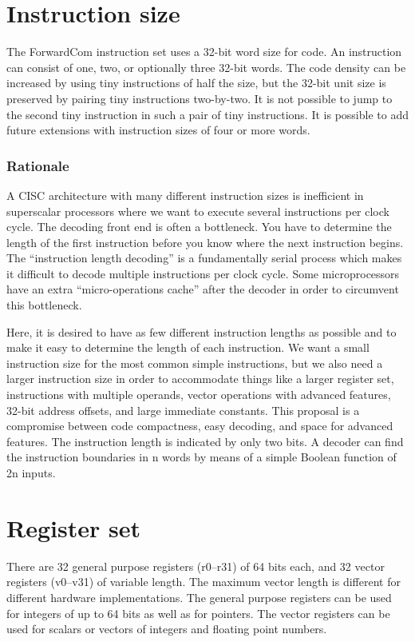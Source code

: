 \documentclass[forwardcom.tex]{subfiles}
\begin{document}
\section{Instruction size}
The ForwardCom instruction set uses a 32-bit word size for code. 
An instruction can consist of one, two, or optionally three 32-bit words. The code density can be increased by using tiny instructions of half the size, but the 32-bit unit size is preserved by pairing tiny instructions two-by-two. It is not possible to jump to the second tiny instruction in such a pair of tiny instructions. It is possible to add future extensions with instruction sizes of four or more words.

\subsubsection{Rationale}
A CISC architecture with many different instruction sizes is inefficient in superscalar processors where we want to execute several instructions per clock cycle. The decoding front end is often a bottleneck. You have to determine the length of the first instruction before you know where the next instruction begins. The ``instruction length decoding'' is a fundamentally serial process which makes it difficult to decode multiple instructions per clock cycle. Some microprocessors have an extra ``micro-operations cache'' after the decoder in order to circumvent this bottleneck.
\vspace{2mm}

Here, it is desired to have as few different instruction lengths as possible and to make it easy to determine the length of each instruction. We want a small instruction size for the most common simple instructions, but we also need a larger instruction size in order to accommodate things like a larger register set, instructions with multiple operands, vector operations with advanced features, 32-bit address offsets, and large immediate constants. This proposal is a compromise between code compactness, easy decoding, and space for advanced features.
The instruction length is indicated by only two bits. A decoder can find the instruction boundaries in n words by means of a simple Boolean function of 2n inputs.

\section{Register set}
There are 32 general purpose registers (r0--r31) of 64 bits each, and 32 vector registers (v0--v31) of variable length. The maximum vector length is different for different hardware implementations. The general purpose registers can be used for integers of up to 64 bits as well as for pointers. The vector registers can be used for scalars or vectors of integers and floating point numbers. 
\vspace{2mm}
\end{document}
